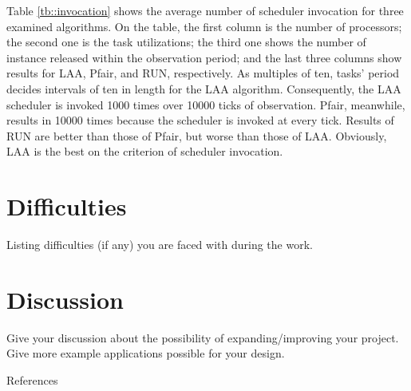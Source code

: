 \documentclass[12pt]{report}
\begin{document}
	Table \ref{tb::invocation} shows the average number of scheduler invocation for three examined algorithms.
	On the table,
	the first column is the number of processors;
	the second one is the task utilizations;
	the third one shows the number of instance released within the observation period; and
	the last three columns show results for LAA, Pfair, and RUN, respectively.
	As multiples of ten,
	tasks' period decides intervals of ten in length for the LAA algorithm.
	Consequently,
	the LAA scheduler is invoked 1000 times over 10000 ticks of observation.
	Pfair, meanwhile,
	results in 10000 times
	because the scheduler is invoked at every tick.
	Results of RUN are better than those of Pfair,
	but worse than those of LAA.
	Obviously,
	LAA is the best on the criterion of scheduler invocation.
	
	\section{Difficulties}
	Listing difficulties (if any) you are faced with during the work.
	
	\section{Discussion}
	Give your discussion about the possibility of expanding/improving your project.
	Give more example applications possible for your design.
	
	\newpage
	 {References}
\end{document}
